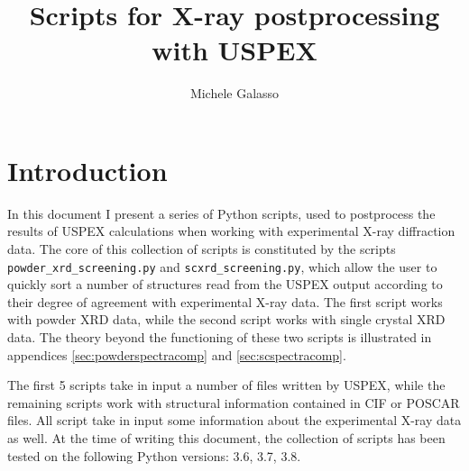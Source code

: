 \documentclass{article}
\begin{document}
\title{Scripts for X-ray postprocessing with USPEX}
\author{Michele Galasso}

\maketitle


\section{Introduction}
In this document I present a series of Python scripts, used to postprocess the results of USPEX calculations when working with experimental X-ray diffraction data. The core of this collection of scripts is constituted by the scripts \texttt{powder\_xrd\_screening.py} and \texttt{scxrd\_screening.py}, which allow the user to quickly sort a number of structures read from the USPEX output according to their degree of agreement with experimental X-ray data. The first script works with powder XRD data, while the second script works with single crystal XRD data. The theory beyond the functioning of these two scripts is illustrated in appendices \ref{sec:powderspectracomp} and \ref{sec:scspectracomp}.

The first 5 scripts take in input a number of files written by USPEX, while the remaining scripts work with structural information contained in CIF or POSCAR files. All script take in input some information about the experimental X-ray data as well. At the time of writing this document, the collection of scripts has been tested on the following Python versions: 3.6, 3.7, 3.8.
\end{document}
